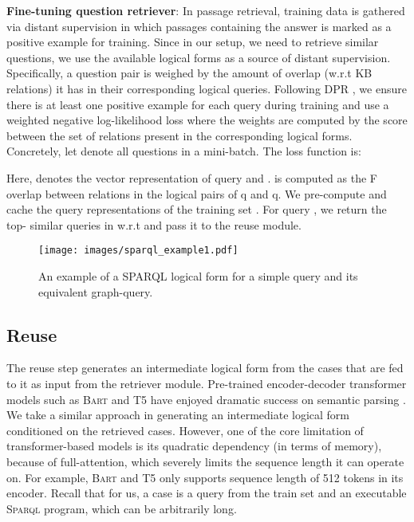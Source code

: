 \documentclass[11pt]{article}
\newcommand{\spql}{\textsc{Sparql}\xspace}
\begin{document}
\textbf{Fine-tuning question retriever}: In passage retrieval, training data is gathered via distant supervision in which passages containing the answer is marked as a positive example for training. Since in our setup, we need to retrieve similar questions, we use the available logical forms as a source of distant supervision. Specifically, a question pair is weighed by the amount of overlap (w.r.t KB relations) it has in their corresponding logical queries. Following DPR \cite{karpukhin2020dense}, we ensure there is at least one positive example for each query during training and use a weighted negative log-likelihood loss where the weights are computed by the  score between the set of relations present in the corresponding logical forms. Concretely, let  denote all questions in a mini-batch. The loss function is:

Here,  denotes the vector representation of query 
 and . 
 is computed as the F overlap between relations in the logical pairs of q and q.
We pre-compute and cache the query representations of the training set . For query , we return the top- similar queries in  w.r.t  and pass it to the reuse module.

\begin{figure}
    \centering
    \texttt{[image: images/sparql\_example1.pdf]}
    \vspace{-5mm}
    \caption{An example of a SPARQL logical form for a simple query and its equivalent graph-query.}
    \label{fig:sparql_example}
\end{figure}

\subsection{Reuse}
\label{sub:reuse}
The reuse step generates an intermediate logical form from the  cases that are fed to it as input from the retriever module. Pre-trained encoder-decoder transformer models such as \textsc{Bart} \cite{lewis-etal-2020-bart} and T5 \cite{t5} have enjoyed dramatic success on semantic parsing \cite{lin2018nl2bash,hwang2019comprehensive,shaw2020compositional,suhr2020exploring}. We take a similar approach in generating an intermediate logical form conditioned on the retrieved cases. However, one of the core limitation of transformer-based models is its quadratic dependency (in terms of memory), because of full-attention, which severely limits the sequence length it can operate on. For example, \textsc{Bart} and T5 only supports sequence length of 512 tokens in its encoder. Recall that for us, a case is a query from the train set and an executable \spql program, which can be arbitrarily long.   
\end{document}
